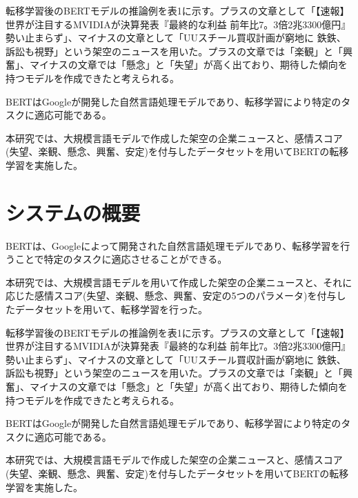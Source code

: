 \documentclass[a4paper, 10pt]{ltjsarticle}
\begin{document}
転移学習後のBERTモデルの推論例を表1に示す。プラスの文章として「【速報】世界が注目するMVIDIAが決算発表『最終的な利益 前年比7。3倍2兆3300億円』勢い止まらず」、マイナスの文章として「UUスチール買収計画が窮地に 鉄鉄、訴訟も視野」という架空のニュースを用いた。プラスの文章では「楽観」と「興奮」、マイナスの文章では「懸念」と「失望」が高く出ており、期待した傾向を持つモデルを作成できたと考えられる。

BERTはGoogleが開発した自然言語処理モデルであり、転移学習により特定のタスクに適応可能である。

本研究では、大規模言語モデルで作成した架空の企業ニュースと、感情スコア(失望、楽観、懸念、興奮、安定)を付与したデータセットを用いてBERTの転移学習を実施した。






\section{システムの概要}

BERTは、Googleによって開発された自然言語処理モデルであり、転移学習を行うことで特定のタスクに適応させることができる。

本研究では、大規模言語モデルを用いて作成した架空の企業ニュースと、それに応じた感情スコア(失望、楽観、懸念、興奮、安定の5つのパラメータ)を付与したデータセットを用いて、転移学習を行った。

転移学習後のBERTモデルの推論例を表1に示す。プラスの文章として「【速報】世界が注目するMVIDIAが決算発表『最終的な利益 前年比7。3倍2兆3300億円』勢い止まらず」、マイナスの文章として「UUスチール買収計画が窮地に 鉄鉄、訴訟も視野」という架空のニュースを用いた。プラスの文章では「楽観」と「興奮」、マイナスの文章では「懸念」と「失望」が高く出ており、期待した傾向を持つモデルを作成できたと考えられる。

BERTはGoogleが開発した自然言語処理モデルであり、転移学習により特定のタスクに適応可能である。

本研究では、大規模言語モデルで作成した架空の企業ニュースと、感情スコア(失望、楽観、懸念、興奮、安定)を付与したデータセットを用いてBERTの転移学習を実施した。

\end{document}

